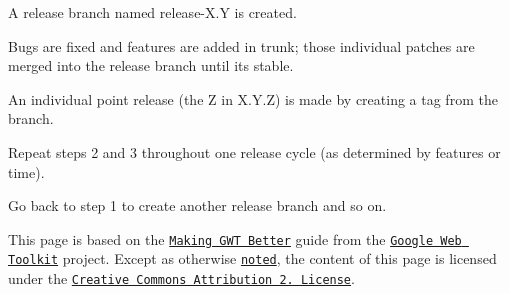 \begin{DoxyEnumerate}
\item A release branch named {\ttfamily release-\/\+X.\+Y} is created.
\end{DoxyEnumerate}
\begin{DoxyEnumerate}
\item Bugs are fixed and features are added in trunk; those individual patches are merged into the release branch until it\textquotesingle{}s stable.
\end{DoxyEnumerate}
\begin{DoxyEnumerate}
\item An individual point release (the {\ttfamily Z} in {\ttfamily X.\+Y.\+Z}) is made by creating a tag from the branch.
\end{DoxyEnumerate}
\begin{DoxyEnumerate}
\item Repeat steps 2 and 3 throughout one release cycle (as determined by features or time).
\end{DoxyEnumerate}
\begin{DoxyEnumerate}
\item Go back to step 1 to create another release branch and so on.
\end{DoxyEnumerate}





This page is based on the \href{http://code.google.com/webtoolkit/makinggwtbetter.html}{\tt Making G\+WT Better} guide from the \href{http://code.google.com/webtoolkit/}{\tt Google Web Toolkit} project. Except as otherwise \href{http://code.google.com/policies.html#restrictions}{\tt noted}, the content of this page is licensed under the \href{http://creativecommons.org/licenses/by/2.5/}{\tt Creative Commons Attribution 2. License}. 